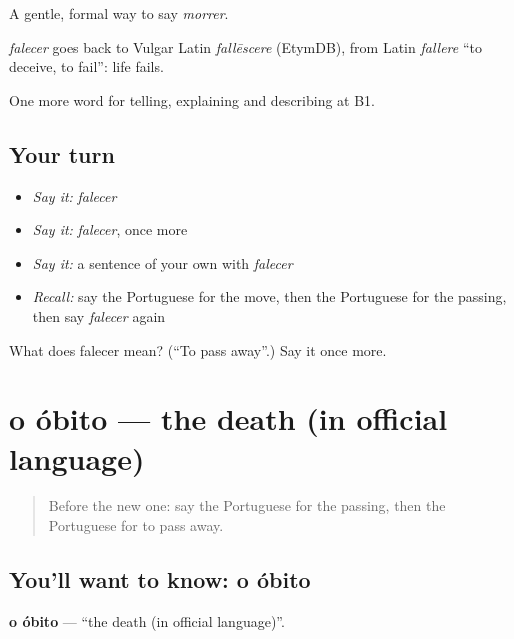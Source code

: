 A gentle, formal way to say \emph{morrer}.

\begin{cousinweb}
\emph{falecer} goes back to Vulgar Latin \emph{fallēscere} (EtymDB), from Latin \emph{fallere} \textquotedblleft{}to deceive, to fail\textquotedblright{}: life fails.
\end{cousinweb}

\begin{grammarlens}[title={What you've built}]
One more word for telling, explaining and describing at B1.
\end{grammarlens}

\subsection*{Your turn}
\begin{itemize}
\raggedright
  \item \emph{Say it:} \emph{falecer}
  \item \emph{Say it:} \emph{falecer}, once more
  \item \emph{Say it:} a sentence of your own with \emph{falecer}
  \item \emph{Recall:} say the Portuguese for the move, then the Portuguese for the passing, then say \emph{falecer} again
\end{itemize}

\begin{tcolorbox}[breakable,colback=teal!4,colframe=teal!35!black,title={Before you move on}]
What does falecer mean? (\textquotedblleft{}To pass away\textquotedblright{}.) Say it once more.
\end{tcolorbox}
\section[o óbito]{o óbito — the death (in official language)}

\label{lesson:PT-C314-obito}



\begin{quote}
Before the new one: say the Portuguese for the passing, then the Portuguese for to pass away.
\end{quote}

\subsection*{You'll want to know: o óbito}
\textbf{o óbito} — \textquotedblleft{}the death (in official language)\textquotedblright{}.

